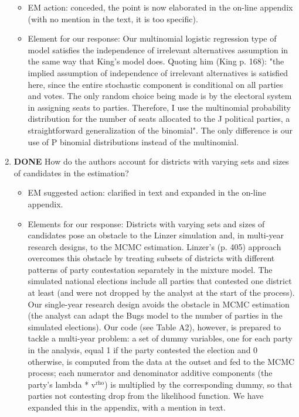 \documentclass{article}
\begin{document}
\begin{enumerate}
\label{sec:orgheadline27}
\begin{itemize}
\item EM action: conceded, the point is now elaborated in the on-line appendix (with no mention in the text, it is too specific).
\item Element for our response: Our multinomial logistic regression type of model satisfies the independence of irrelevant alternatives assumption in the same way that King's model does. Quoting him (King p. 168): "the implied assumption of independence of irrelevant alternatives is satisfied here, since the entire stochastic component is conditional on all parties and votes. The only random choice being made is by the electoral system in assigning seats to parties. Therefore, I use the multinomial probability distribution for the number of seats allocated to the J political parties, a straightforward generalization of the binomial". The only difference is our use of P binomial distributions instead of the multinomial.
\end{itemize}
\item {\bfseries\sffamily DONE} How do the authors account for districts with varying sets and sizes of candidates in the estimation?
\label{sec:orgheadline28}
\begin{itemize}
\item EM suggested action: clarified in text and expanded in the on-line appendix.
\item Elements for our response: Districts with varying sets and sizes of candidates pose an obstacle to the Linzer simulation and, in multi-year research designs, to the MCMC estimation. Linzer's (p. 405) approach overcomes this obstacle by treating subsets of districts with different patterns of party contestation separately in the mixture model. The simulated national elections include all parties that contested one district at least (and were not dropped by the analyst at the start of the process). Our single-year research design avoids the obstacle in MCMC estimation (the analyst can adapt the Bugs model to the number of parties in the simulated elections). Our code (see Table A2), however, is prepared to tackle a multi-year problem: a set of dummy variables, one for each party in the analysis, equal 1 if the party contested the election and 0 otherwise, is computed from the data at the outset and fed to the MCMC process; each numerator and denominator additive components (the party's lambda * v\(^{\text{rho}}\)) is multiplied by the corresponding dummy, so that parties not contesting drop from the likelihood function. We have expanded this in the appendix, with a mention in text.

\end{itemize}
\end{enumerate}
\end{document}
